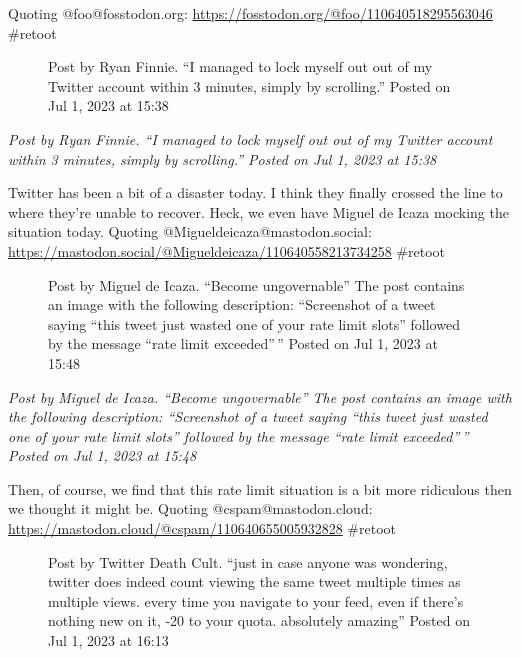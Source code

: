 Quoting @foo@fosstodon.org:
\url{https://fosstodon.org/@foo/110640518295563046} \#retoot

\begin{figure}
\centering
{}
\caption{Post by Ryan Finnie. ``I managed to lock myself out out of my
Twitter account within 3 minutes, simply by scrolling.'' Posted on Jul
1, 2023 at 15:38}
\end{figure}

\emph{Post by Ryan Finnie. ``I managed to lock myself out out of my
Twitter account within 3 minutes, simply by scrolling.'' Posted on Jul
1, 2023 at 15:38}

Twitter has been a bit of a disaster today. I think they finally crossed
the line to where they're unable to recover. Heck, we even have Miguel
de Icaza mocking the situation today. Quoting
@Migueldeicaza@mastodon.social:
\url{https://mastodon.social/@Migueldeicaza/110640558213734258} \#retoot

\begin{figure}
\centering
{}
\caption{Post by Miguel de Icaza. ``Become ungovernable'' The post
contains an image with the following description: ``Screenshot of a
tweet saying ``this tweet just wasted one of your rate limit slots''
followed by the message ``rate limit exceeded''\,'' Posted on Jul 1,
2023 at 15:48}
\end{figure}

\emph{Post by Miguel de Icaza. ``Become ungovernable'' The post contains
an image with the following description: ``Screenshot of a tweet saying
``this tweet just wasted one of your rate limit slots'' followed by the
message ``rate limit exceeded''\,'' Posted on Jul 1, 2023 at 15:48}

Then, of course, we find that this rate limit situation is a bit more
ridiculous then we thought it might be. Quoting @cspam@mastodon.cloud:
\url{https://mastodon.cloud/@cspam/110640655005932828} \#retoot

\begin{figure}
\centering
{}
\caption{Post by Twitter Death Cult. ``just in case anyone was
wondering, twitter does indeed count viewing the same tweet multiple
times as multiple views. every time you navigate to your feed, even if
there's nothing new on it, -20 to your quota. absolutely amazing''
Posted on Jul 1, 2023 at 16:13}
\end{figure}

